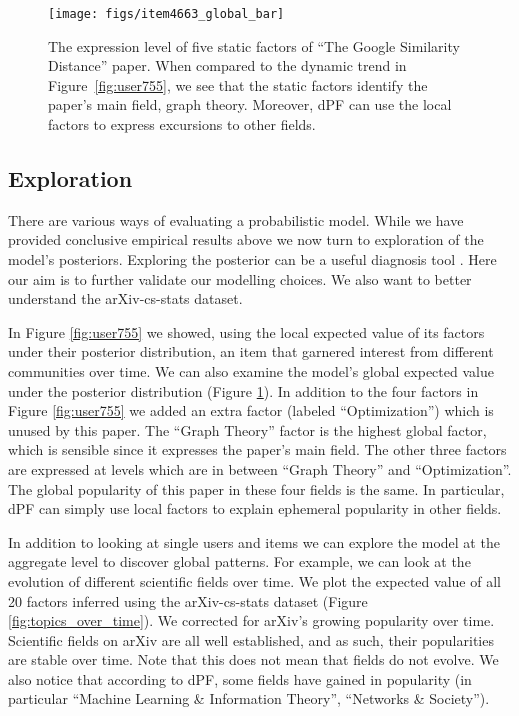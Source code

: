 \documentclass{sig-alternate}
\begin{document}
\begin{figure}[ht]
\begin{center}
  \texttt{[image: figs/item4663\_global\_bar]}
\end{center}
\caption{The expression level of five static factors of ``The Google Similarity Distance'' paper. When compared to the dynamic trend in Figure~\ref{fig:user755},
we see that the static factors identify the paper's main field, graph theory. 
Moreover, dPF can use the local factors to express excursions to other fields.
}
\label{fig:item4663_global}
\end{figure}

\subsection{Exploration} 
\label{sec:exploration}
\noindent
There are various ways of evaluating a probabilistic model. While we have
provided conclusive empirical results above we now turn to exploration of the
model's posteriors. Exploring the posterior can be a useful diagnosis tool
\citep{doi:10.1146/annurev-statistics-022513-115657}. Here our aim is to
further validate our modelling choices. We also want to better understand
the arXiv-cs-stats dataset. 

In Figure \ref{fig:user755} we showed, using the local expected value of its
factors under their posterior distribution, an item that garnered interest
from different communities over time. We can also examine the model's global
expected value under the posterior distribution (Figure
\ref{fig:item4663_global}). In addition to the four factors in Figure
\ref{fig:user755} we added an extra factor (labeled ``Optimization'') which
is unused by this paper. The ``Graph Theory'' factor is the highest
global factor, which is sensible since it expresses the paper's main field. The
other three factors are expressed at levels which are in between ``Graph
Theory'' and ``Optimization''. The global popularity of this paper in these
four fields is the same. In particular, dPF can simply use local factors to
explain ephemeral popularity in other fields. 



In addition to looking at single users and items we can explore the model at the
aggregate level to discover global patterns. For example, we can look at the
evolution of different scientific fields over time. We plot the expected value
of all 20 factors inferred using the arXiv-cs-stats dataset (Figure
\ref{fig:topics_over_time}). We corrected for
arXiv's growing popularity over time.  Scientific fields on arXiv are all well
established, and as such, their popularities are stable over time. Note that this does
not mean that fields do not evolve. We also notice that according to dPF, some
fields have gained in popularity (in particular ``Machine Learning \&
Information Theory'', ``Networks \& Society'').
\end{document}
